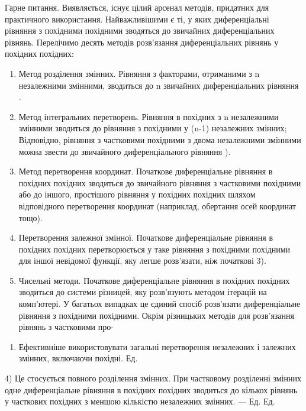 \documentclass[
  ukrainian,
]{article}
\providecommand{\tightlist}{%
  \setlength{\itemsep}{0pt}\setlength{\parskip}{0pt}}
\begin{document}
Гарне питання. Виявляється, існує цілий арсенал методів, придатних для
практичного використання. Найважливішими є ті, у яких диференціальні
рівняння з похідними похідними зводяться до звичайних диференціальних
рівнянь. Перелічимо десять методів розв'язання диференціальних рівнянь у
похідних похідних:

\begin{enumerate}
\def\labelenumi{\arabic{enumi}.}
\item
  Метод розділення змінних. Рівняння з факторами, отриманими з n
  незалежними змінними, зводиться до n звичайних диференціальних
  рівняння .
\item
  Метод інтегральних перетворень. Рівняння в похідних з n незалежними
  змінними зводиться до рівняння з похідними у (n-1) незалежних змінних;
  Відповідно, рівняння з частковими похідними з двома незалежними
  змінними можна звести до звичайного диференціального рівняння ).
\item
  Метод перетворення координат. Початкове диференціальне рівняння в
  похідних похідних зводиться до звичайного рівняння з частковими
  похідними або до іншого, простішого рівняння у похідних похідних
  шляхом відповідного перетворення координат (наприклад, обертання осей
  координат тощо).
\item
  Перетворення залежної змінної. Початкове диференціальне рівняння в
  похідних похідних перетворюється у таке рівняння з похідними похідними
  для іншої невідомої функції, яку легше розв'язати, ніж початкові 3).
\item
  Чисельні методи. Початкове диференціальне рівняння в похідних похідних
  зводиться до системи різницей, яку розв'язують методом ітерацій на
  комп'ютері. У багатьох випадках це єдиний спосіб розв'язати
  диференціальне рівняння з похідними похідними. Окрім різницьких
  методів для розв'язання рівнянь з частковими про-
\end{enumerate}

\begin{enumerate}
\def\labelenumi{\alph{enumi})}
\setcounter{enumi}{4}
\tightlist
\item
  Ефективніше використовувати загальні перетворення незалежних і
  залежних змінних, включаючи похідні. Ед.
\end{enumerate}

4) Це стосується повного розділення змінних. При частковому розділенні
змінних одне диференціальне рівняння в похідних похідних зводиться до
кількох рівнянь у часткових похідних з меншою кількістю незалежних
змінних. --- Ед. Ед.
\end{document}
